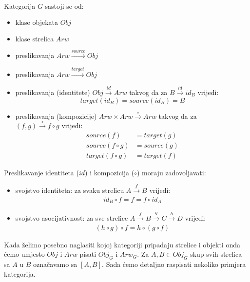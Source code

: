   \begin{definition}\ \\
  
	\noindent Kategorija $G$ sastoji se od:
    \begin{itemize}
      \item klase objekata $Obj$
      \item klase strelica $Arw$
      \item preslikavanja $Arw \xrightarrow{source} Obj$
      \item preslikavanja $Arw \xrightarrow{target} Obj$
      \item preslikavanja (identitete) $Obj \xrightarrow{id} Arw$ takvog da
      za $B \xrightarrow{id} id_B$ vrijedi:
        \begin{equation*}
          target(id_B) = source(id_B) = B
        \end{equation*}
      \item preslikavanja (kompozicije) $Arw \times Arw \xrightarrow{\circ}
      Arw$ takvog da za \\ $(f, g) \xrightarrow{\circ} f \circ g$ vrijedi:
        \begin{align*}
          source(f) &= target(g) \\
          source(f \circ g) &= source(g) \\
          target(f \circ g) &= target(f)
        \end{align*}
    \end{itemize}
    
    Preslikavanje identiteta ($id$) i kompozicija ($\circ$) moraju
    zadovoljavati:
    \begin{itemize}
      \item svojstvo identiteta: za svaku strelicu $A \xrightarrow{f} B$ vrijedi:
        \begin{align*}
          id_B \circ f = f = f \circ id_A
        \end{align*}
      \item svojstvo asocijativnost: za sve strelice $A \xrightarrow{f} B
      \xrightarrow{g} C \xrightarrow{h} D$ vrijedi:
        \begin{align*} \label{def:kat_assoc}
          (h \circ g) \circ f = h \circ (g \circ f)
        \end{align*}
    \end{itemize}
  \end{definition}
  Kada želimo posebno naglasiti kojoj kategoriji pripadaju strelice i objekti
  onda ćemo umjesto $Obj$ i $Arw$ pisati $Obj_G$ i $Arw_G$.
  Za $A, B \in Obj_G$ skup svih strelica sa $A$ u $B$ označavamo sa
  $[A, B]$.
  Sada ćemo detaljno raspisati nekoliko primjera kategorija.\\

